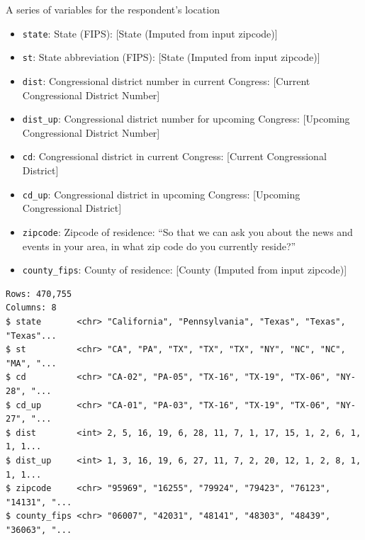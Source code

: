 \documentclass[10pt,article,oneside]{memoir}
\theoremstyle{definition}
\begin{document}
A series of variables for the respondent's location

\begin{itemize}
\tightlist
\item
  \texttt{state}: State (FIPS): {[}State (Imputed from input zipcode){]}
\item
  \texttt{st}: State abbreviation (FIPS): {[}State (Imputed from input
  zipcode){]}
\item
  \texttt{dist}: Congressional district number in current Congress:
  {[}Current Congressional District Number{]}
\item
  \texttt{dist\_up}: Congressional district number for upcoming
  Congress: {[}Upcoming Congressional District Number{]}
\item
  \texttt{cd}: Congressional district in current Congress: {[}Current
  Congressional District{]}
\item
  \texttt{cd\_up}: Congressional district in upcoming Congress:
  {[}Upcoming Congressional District{]}
\item
  \texttt{zipcode}: Zipcode of residence: ``So that we can ask you about
  the news and events in your area, in what zip code do you currently
  reside?''
\item
  \texttt{county\_fips}: County of residence: {[}County (Imputed from
  input zipcode){]}
\end{itemize}

\begin{verbatim}
Rows: 470,755
Columns: 8
$ state       <chr> "California", "Pennsylvania", "Texas", "Texas", "Texas"...
$ st          <chr> "CA", "PA", "TX", "TX", "TX", "NY", "NC", "NC", "MA", "...
$ cd          <chr> "CA-02", "PA-05", "TX-16", "TX-19", "TX-06", "NY-28", "...
$ cd_up       <chr> "CA-01", "PA-03", "TX-16", "TX-19", "TX-06", "NY-27", "...
$ dist        <int> 2, 5, 16, 19, 6, 28, 11, 7, 1, 17, 15, 1, 2, 6, 1, 1, 1...
$ dist_up     <int> 1, 3, 16, 19, 6, 27, 11, 7, 2, 20, 12, 1, 2, 8, 1, 1, 1...
$ zipcode     <chr> "95969", "16255", "79924", "79423", "76123", "14131", "...
$ county_fips <chr> "06007", "42031", "48141", "48303", "48439", "36063", "...
\end{verbatim}
\end{document}
